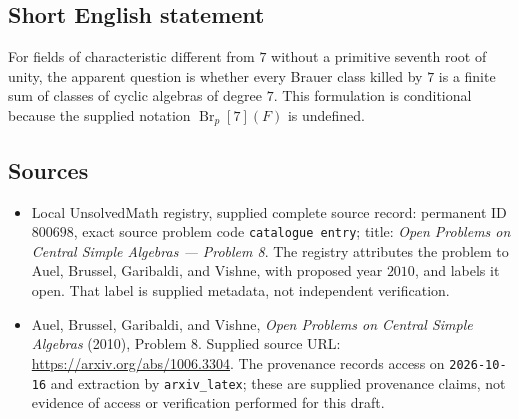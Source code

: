\documentclass[11pt]{article}
\begin{document}
\subsection{Short English statement}
For fields of characteristic different from \(7\) without a primitive seventh root of unity, the apparent question is whether every Brauer class killed by \(7\) is a finite sum of classes of cyclic algebras of degree \(7\). This formulation is conditional because the supplied notation \(\operatorname{Br}_{p}[7](F)\) is undefined.
\subsection{Sources}
\begin{itemize}
\item Local UnsolvedMath registry, supplied complete source record: permanent ID \(800698\), exact source problem code \texttt{catalogue entry}; title: \emph{Open Problems on Central Simple Algebras --- Problem 8}. The registry attributes the problem to Auel, Brussel, Garibaldi, and Vishne, with proposed year \(2010\), and labels it open. That label is supplied metadata, not independent verification.
\item Auel, Brussel, Garibaldi, and Vishne, \emph{Open Problems on Central Simple Algebras} (2010), Problem 8. Supplied source URL: \url{https://arxiv.org/abs/1006.3304}. The provenance records access on \texttt{2026-10-16} and extraction by \texttt{arxiv\_latex}; these are supplied provenance claims, not evidence of access or verification performed for this draft.
\end{itemize}
\end{document}
